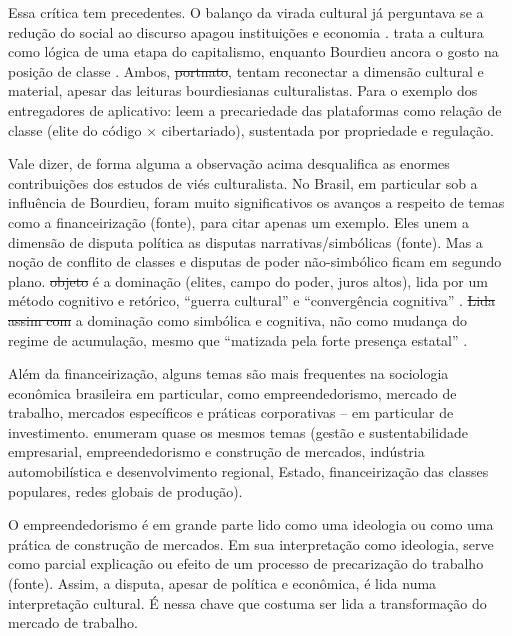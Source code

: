 Essa crítica tem precedentes. O balanço da virada cultural já perguntava se a redução do social ao discurso apagou instituições e economia \citep{bonnell_beyond_1999}. \citet{jameson_postmodernism_1991} trata a cultura como lógica de uma etapa do capitalismo, enquanto Bourdieu ancora o gosto na posição de classe \citep{bourdieu_distinction_1984}. Ambos, \sout{portnato}, tentam reconectar a dimensão cultural e material, apesar das leituras bourdiesianas culturalistas. Para o exemplo dos entregadores de aplicativo: \citet{burrell_society_2021} leem a precariedade das plataformas como relação de classe (elite do código × cibertariado), sustentada por propriedade e regulação.

Vale dizer, de forma alguma a observação acima desqualifica as enormes contribuições dos estudos de viés culturalista. No Brasil, em particular sob a influência de Bourdieu, foram muito significativos os avanços a respeito de temas como a financeirização (fonte), para citar apenas um exemplo. Eles unem a dimensão de disputa política as disputas narrativas/simbólicas (fonte). Mas a noção de conflito de classes e disputas de poder não-simbólico ficam em segundo plano. \sout{objeto} é a dominação (elites, campo do poder, juros altos), lida por um método cognitivo e retórico, ``guerra cultural'' e ``convergência cognitiva'' \citep[p.~38-41]{veretanahoum_sociologia_2017}. \sout{Lida assim com} a dominação como simbólica e cognitiva, não como mudança do regime de acumulação, mesmo que ``matizada pela forte presença estatal'' \citep[p.~41]{veretanahoum_sociologia_2017}.

Além da financeirização, alguns temas são mais frequentes na sociologia econômica brasileira em particular, como empreendedorismo, mercado de trabalho, mercados específicos e práticas corporativas -- em particular de investimento. \citet[p.~13]{lima_apresentacao_2018} enumeram quase os mesmos temas (gestão e sustentabilidade empresarial, empreendedorismo e construção de mercados, indústria automobilística e desenvolvimento regional, Estado, financeirização das classes populares, redes globais de produção).

O empreendedorismo é em grande parte lido como uma ideologia ou como uma prática de construção de mercados. Em sua interpretação como ideologia, serve como parcial explicação ou efeito de um processo de precarização do trabalho (fonte). Assim, a disputa, apesar de política e econômica, é lida numa interpretação cultural. É nessa chave que costuma ser lida a transformação do mercado de trabalho. 

